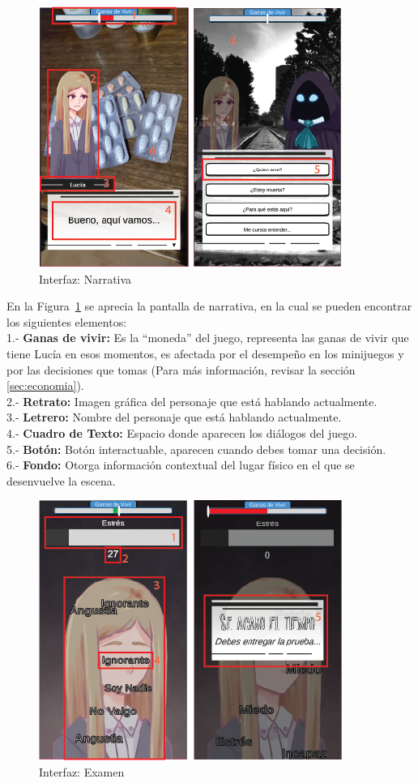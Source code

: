 \newpage
\begin{figure}[ht]
    \centering
    \includegraphics{imgs/hud-narrativa.png}
    \caption{Interfaz: Narrativa}
    \label{fig:hud-narrativa}
\end{figure}

En la Figura~\ref{fig:hud-narrativa} se aprecia la pantalla de narrativa, en la cual se pueden encontrar los siguientes elementos:\\
1.- \textbf{Ganas de vivir:} Es la ``moneda'' del juego, representa las ganas de vivir que tiene Lucía en esos momentos, es afectada por el desempeño en los minijuegos y por las decisiones que tomas (Para más información, revisar la sección \ref{sec:economia}).\\
2.- \textbf{Retrato:} Imagen gráfica del personaje que está hablando actualmente.\\
3.- \textbf{Letrero:} Nombre del personaje que está hablando actualmente.\\
4.- \textbf{Cuadro de Texto:} Espacio donde aparecen los diálogos del juego.\\
5.- \textbf{Botón:} Botón interactuable, aparecen cuando debes tomar una decisión.\\
6.- \textbf{Fondo:} Otorga información contextual del lugar físico en el que se desenvuelve la escena.

\newpage
\begin{figure}[ht]
    \centering
    \includegraphics{imgs/hud-examen.png}
    \caption{Interfaz: Examen}
    \label{fig:hud-examen}
\end{figure}


